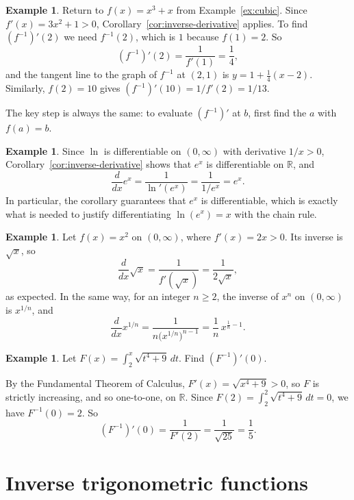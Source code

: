 \documentclass[12pt,letterpaper]{article}
\theoremstyle{definition}
\newtheorem{example}[theorem]{Example}
\begin{document}
\begin{example}\label{ex:cubic-derivative}
  Return to $f(x)=x^3+x$ from Example~\ref{ex:cubic}. Since
  $f'(x)=3x^2+1>0$, Corollary~\ref{cor:inverse-derivative} applies. To find
  $(f^{-1})'(2)$ we need $f^{-1}(2)$, which is $1$ because $f(1)=2$. So
  \[
    (f^{-1})'(2)=\frac{1}{f'(1)}=\frac14,
  \]
  and the tangent line to the graph of $f^{-1}$ at $(2,1)$ is
  $y=1+\frac14(x-2)$. Similarly, $f(2)=10$ gives
  $(f^{-1})'(10)=1/f'(2)=1/13$.

  The key step is always the same: to evaluate $(f^{-1})'$ at $b$, first find
  the $a$ with $f(a)=b$.
\end{example}

\begin{example}
  Since $\ln$ is differentiable on $(0,\infty)$ with derivative $1/x>0$,
  Corollary~\ref{cor:inverse-derivative} shows that $e^x$ is differentiable
  on $\mathbb{R}$, and
  \[
    \frac{d}{dx}e^x=\frac{1}{\ln'(e^x)}=\frac{1}{1/e^x}=e^x.
  \]
  In particular, the corollary guarantees that $e^x$ is differentiable, which
  is exactly what is needed to justify differentiating $\ln(e^x)=x$ with the
  chain rule.
\end{example}

\begin{example}
  Let $f(x)=x^2$ on $(0,\infty)$, where $f'(x)=2x>0$. Its inverse is
  $\sqrt{x}$, so
  \[
    \frac{d}{dx}\sqrt{x}=\frac{1}{f'(\sqrt{x})}=\frac{1}{2\sqrt{x}},
  \]
  as expected. In the same way, for an integer $n\geq2$, the inverse of $x^n$
  on $(0,\infty)$ is $x^{1/n}$, and
  \[
    \frac{d}{dx}x^{1/n}=\frac{1}{n\bigl(x^{1/n}\bigr)^{n-1}}
      =\frac1n\,x^{\frac1n-1}.
  \]
\end{example}

\begin{example}
  Let $F(x)=\displaystyle\int_2^x\sqrt{t^4+9}\,dt$. Find $(F^{-1})'(0)$.

  By the Fundamental Theorem of Calculus, $F'(x)=\sqrt{x^4+9}>0$, so $F$ is
  strictly increasing, and so one-to-one, on $\mathbb{R}$. Since
  $F(2)=\int_2^2\sqrt{t^4+9}\,dt=0$, we have $F^{-1}(0)=2$. So
  \[
    (F^{-1})'(0)=\frac{1}{F'(2)}=\frac{1}{\sqrt{25}}=\frac15.
  \]
\end{example}

\section{Inverse trigonometric functions}\label{sec:inverse-trig}
\end{document}

